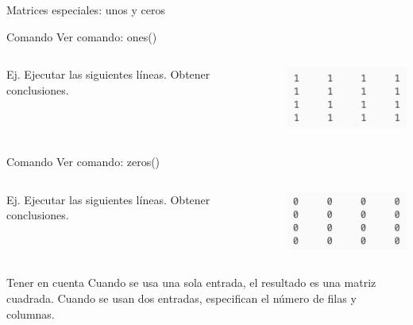 \begin{frame}{Matrices especiales: unos y ceros}
\begin{exampleblock}{Comando}
Ver comando: ones()
\end{exampleblock}
\begin{columns}
\begin{column}{0.5\textwidth}
Ej. Ejecutar las siguientes líneas. Obtener conclusiones.
\end{column}
\begin{column}{0.5\textwidth}
\begin{center}
\includegraphics[scale=0.5]{images/pantalla1.png}
\end{center}
\end{column}
\end{columns}
\begin{exampleblock}{Comando}
Ver comando: zeros()
\end{exampleblock}
\begin{columns}
\begin{column}{0.5\textwidth}
Ej. Ejecutar las siguientes líneas. Obtener conclusiones.
\end{column}
\begin{column}{0.5\textwidth}
\begin{center}
\includegraphics[scale=0.5]{images/pantalla2.png}
\end{center}
\end{column}
\end{columns}
\begin{block}{Tener en cuenta}
Cuando se usa una sola entrada, el resultado es una matriz cuadrada. Cuando se usan dos entradas, especifican el número de filas y columnas.
\end{block}
\end{frame}

